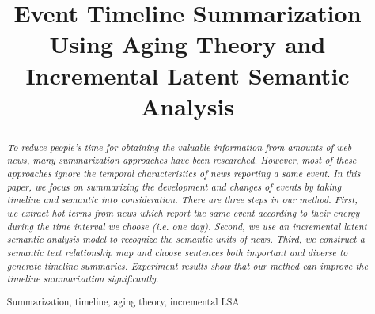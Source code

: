 \documentclass[runningheads,a4paper]{llncs}
\newcommand{\keywords}[1]{\par\addvspace\baselineskip
\noindent\keywordname\enspace\ignorespaces#1}
\begin{document}
\mainmatter  %

\title{Event Timeline Summarization Using Aging Theory and Incremental Latent Semantic Analysis}


%
%




%
%

\maketitle


\begin{abstract}
\emph{To reduce people’s time for obtaining the valuable information from amounts of web news, many summarization approaches have been researched. However, most of these approaches ignore the temporal characteristics of news reporting a same event. In this paper, we focus on summarizing the development and changes of events by taking timeline and semantic into consideration. There are three steps in our method. First, we extract hot terms from news which report the same event according to their energy during the time interval we choose (i.e. one day). Second, we use an incremental latent semantic analysis model to recognize the semantic units of news. Third, we construct a semantic text relationship map and choose sentences both important and diverse to generate timeline summaries. Experiment results show that our method can improve the timeline summarization significantly.}

\keywords{Summarization, timeline, aging theory, incremental LSA}
\end{abstract}
\end{document}
